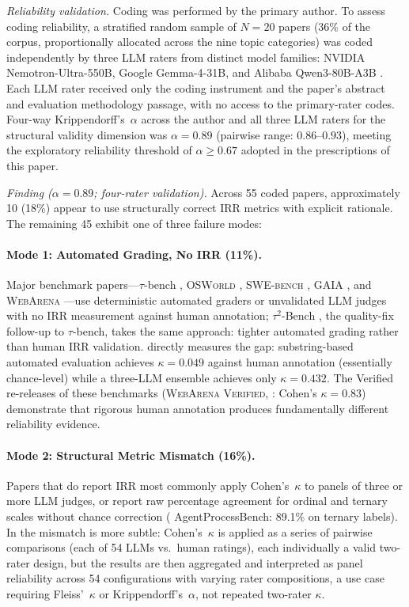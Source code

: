 \documentclass[preprint,12pt]{elsarticle}
\newcommand{\ka}{Krippendorff's~$\alpha$}
\newcommand{\fk}{Fleiss'~$\kappa$}
\newcommand{\ck}{Cohen's~$\kappa$}
\begin{document}
\textit{Reliability validation.} Coding was performed by the primary author. To
assess coding reliability, a stratified random sample of $N=20$ papers (36\% of the
corpus, proportionally allocated across the nine topic categories) was coded
independently by three LLM raters from distinct model families: NVIDIA
Nemotron-Ultra-550B, Google Gemma-4-31B, and Alibaba Qwen3-80B-A3B
\citep{openrouter2026}. Each LLM rater
received only the coding instrument and the paper's abstract and evaluation
methodology passage, with no access to the primary-rater codes. Four-way
Krippendorff's~$\alpha$ across the author and all three LLM raters for the
structural validity dimension was $\alpha = 0.89$ (pairwise range: $0.86$--$0.93$),
meeting the exploratory reliability threshold of $\alpha \geq 0.67$ adopted in the
prescriptions of this paper.

\textit{Finding ($\alpha = 0.89$; four-rater validation).} Across 55 coded papers,
approximately 10 (18\%) appear to use structurally correct IRR metrics with explicit
rationale. The remaining 45 exhibit one of three failure modes:

\paragraph{Mode 1: Automated Grading, No IRR (11\%).}
Major benchmark papers---$\tau$-bench \citep{yao2024}, \textsc{OSWorld} \citep{xie2024},
\textsc{SWE-bench} \citep{jimenez2024}, \textsc{GAIA} \citep{mialon2024}, and
\textsc{WebArena} \citep{zhou2024webarena}---use deterministic automated graders or
unvalidated LLM judges with no IRR measurement against human annotation; $\tau^2$-Bench
\citep{barres2025}, the quality-fix follow-up to $\tau$-bench, takes the same approach:
tighter automated grading rather than human IRR validation. \citet{gurram2026} directly
measures the gap: substring-based automated evaluation achieves $\kappa = 0.049$ against
human annotation (essentially chance-level) while a three-LLM ensemble achieves only
$\kappa = 0.432$. The Verified re-releases of these benchmarks
(\textsc{WebArena Verified}, \citealt{elhattami2025}: Cohen's $\kappa = 0.83$)
demonstrate that rigorous human annotation produces fundamentally different reliability
evidence.

\paragraph{Mode 2: Structural Metric Mismatch (16\%).}
Papers that do report IRR most commonly apply \ck{} to panels of three or more LLM
judges, or report raw percentage agreement for ordinal and ternary scales without
chance correction (\citealt{fan2026} AgentProcessBench: 89.1\% on ternary labels).
In \citet{han2025} the mismatch is more subtle: \ck{} is applied as a series of
pairwise comparisons (each of 54 LLMs vs.\ human ratings), each individually a valid
two-rater design, but the results are then aggregated and interpreted as panel
reliability across 54 configurations with varying rater compositions, a use case
requiring \fk{} or \ka, not repeated two-rater $\kappa$.
\end{document}
